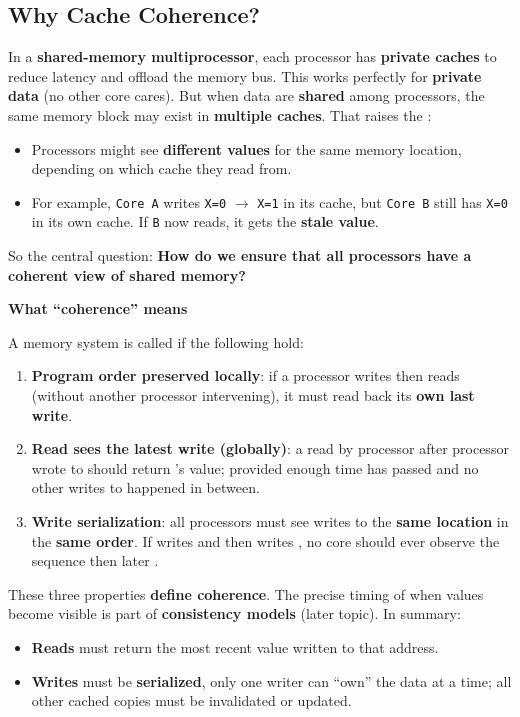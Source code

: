 \subsection{Why Cache Coherence?}

In a \textbf{shared-memory multiprocessor}, each processor has \textbf{private caches} to reduce latency and offload the memory bus. This works perfectly for \textbf{private data} (no other core cares). But when data are \textbf{shared} among processors, the same memory block may exist in \textbf{multiple caches}. That raises the :
\begin{itemize}
    \item Processors might see \textbf{different values} for the same memory location, depending on which cache they read from.
    \item For example, \texttt{Core A} writes \texttt{X=0} $\to$ \texttt{X=1} in its cache, but \texttt{Core B} still has \texttt{X=0} in its own cache. If \texttt{B} now reads, it gets the \textbf{stale value}.
\end{itemize}
So the central question: \textbf{How do we ensure that all processors have a coherent view of shared memory?}

\highspace
\begin{flushleft}
    \textcolor{Green3}{ \textbf{What ``coherence'' means}}
\end{flushleft}
A memory system is called  if the following hold:
\begin{enumerate}
    \item \textbf{Program order preserved locally}: if a processor writes  then reads  (without another processor intervening), it must read back its \textbf{own last write}.
    \item \textbf{Read sees the latest write (globally)}: a read by processor  after processor  wrote to  should return 's value; provided enough time has passed and no other writes to  happened in between.
    \item \textbf{Write serialization}: all processors must see writes to the \textbf{same location} in the \textbf{same order}. If  writes  and then  writes , no core should ever observe the sequence  then later .
\end{enumerate}
These three properties \textbf{define coherence}. The precise timing of when values become visible is part of \textbf{consistency models} (later topic). In summary:
\begin{itemize}
    \item \textbf{Reads} must return the most recent value written to that address.
    \item \textbf{Writes} must be \textbf{serialized}, only one writer can ``own'' the data at a time; all other cached copies must be invalidated or updated.
\end{itemize}

